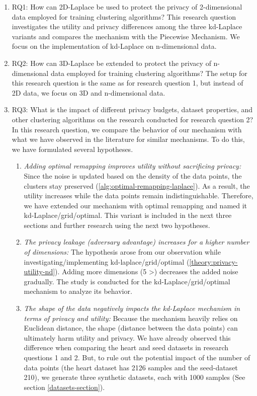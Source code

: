 \begin{enumerate}
  \item RQ1: How can 2D-Laplace be used to protect the privacy of 2-dimensional data employed for training clustering algorithms? \newline
        This research question investigates the utility and privacy differences among the three kd-Laplace variants and compares the mechanism with the Piecewise Mechanism.
        We focus on the implementation of kd-Laplace on n-dimensional data.
  \item RQ2: How can 3D-Laplace be extended to protect the privacy of n-dimensional data employed for training clustering algorithms? \newline
        The setup for this research question is the same as for research question 1, but instead of 2D data, we focus on 3D and n-dimensional data.
  \item RQ3: What is the impact of different privacy budgets, dataset properties, and other clustering algorithms on the research conducted for research question 2? \newline
        In this research question, we compare the behavior of our mechanism with what we have observed in the literature for similar mechanisms.
        To do this, we have formulated several hypotheses. \label{method:research-question-3}
        \begin{enumerate}
          \item \textit{Adding optimal remapping improves utility without sacrificing privacy:}
                Since the noise is updated based on the density of the data points, the clusters stay preserved (\ref{alg:optimal-remapping-laplace}).
                As a result, the utility increases while the data points remain indistinguishable.
                Therefore, we have extended our mechanism with optimal remapping and named it kd-Laplace/grid/optimal.
                This variant is included in the next three sections and further research using the next two hypotheses.
          \item \textit{The privacy leakage (adversary advantage) increases for a higher number of dimensions:}
                The hypothesis arose from our observation while investigating/implementing kd-laplace/grid/optimal (\ref{theory:privacy-utility-nd}).
                Adding more dimensions (5 >) decreases the added noise gradually.
                The study is conducted for the kd-Laplace/grid/optimal mechanism to analyze its behavior.
          \item \textit{The shape of the data negatively impacts the kd-Laplace mechanism in terms of privacy and utility:}
                Because the mechanism heavily relies on Euclidean distance, the shape (distance between the data points) can ultimately harm utility and privacy.
                We have already observed this difference when comparing the heart and seed datasets in research questions 1 and 2.
                But, to rule out the potential impact of the number of data points (the heart dataset has 2126 samples and the seed-dataset 210), we generate three synthetic datasets, each with 1000 samples (See section \ref{datasets-section}).


\end{enumerate}
\end{enumerate}
